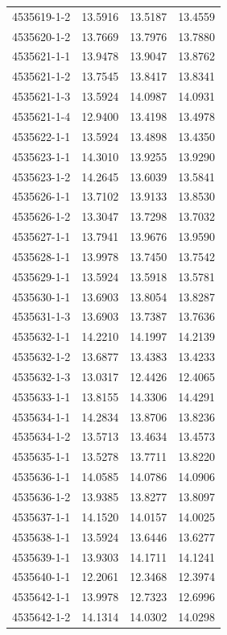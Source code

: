 \begin{longtable}{lrrr}
4535619-1-2 & 13.5916 & 13.5187 & 13.4559 \\
4535620-1-2 & 13.7669 & 13.7976 & 13.7880 \\
4535621-1-1 & 13.9478 & 13.9047 & 13.8762 \\
4535621-1-2 & 13.7545 & 13.8417 & 13.8341 \\
4535621-1-3 & 13.5924 & 14.0987 & 14.0931 \\
4535621-1-4 & 12.9400 & 13.4198 & 13.4978 \\
4535622-1-1 & 13.5924 & 13.4898 & 13.4350 \\
4535623-1-1 & 14.3010 & 13.9255 & 13.9290 \\
4535623-1-2 & 14.2645 & 13.6039 & 13.5841 \\
4535626-1-1 & 13.7102 & 13.9133 & 13.8530 \\
4535626-1-2 & 13.3047 & 13.7298 & 13.7032 \\
4535627-1-1 & 13.7941 & 13.9676 & 13.9590 \\
4535628-1-1 & 13.9978 & 13.7450 & 13.7542 \\
4535629-1-1 & 13.5924 & 13.5918 & 13.5781 \\
4535630-1-1 & 13.6903 & 13.8054 & 13.8287 \\
4535631-1-3 & 13.6903 & 13.7387 & 13.7636 \\
4535632-1-1 & 14.2210 & 14.1997 & 14.2139 \\
4535632-1-2 & 13.6877 & 13.4383 & 13.4233 \\
4535632-1-3 & 13.0317 & 12.4426 & 12.4065 \\
4535633-1-1 & 13.8155 & 14.3306 & 14.4291 \\
4535634-1-1 & 14.2834 & 13.8706 & 13.8236 \\
4535634-1-2 & 13.5713 & 13.4634 & 13.4573 \\
4535635-1-1 & 13.5278 & 13.7711 & 13.8220 \\
4535636-1-1 & 14.0585 & 14.0786 & 14.0906 \\
4535636-1-2 & 13.9385 & 13.8277 & 13.8097 \\
4535637-1-1 & 14.1520 & 14.0157 & 14.0025 \\
4535638-1-1 & 13.5924 & 13.6446 & 13.6277 \\
4535639-1-1 & 13.9303 & 14.1711 & 14.1241 \\
4535640-1-1 & 12.2061 & 12.3468 & 12.3974 \\
4535642-1-1 & 13.9978 & 12.7323 & 12.6996 \\
4535642-1-2 & 14.1314 & 14.0302 & 14.0298 \\

\end{longtable}
